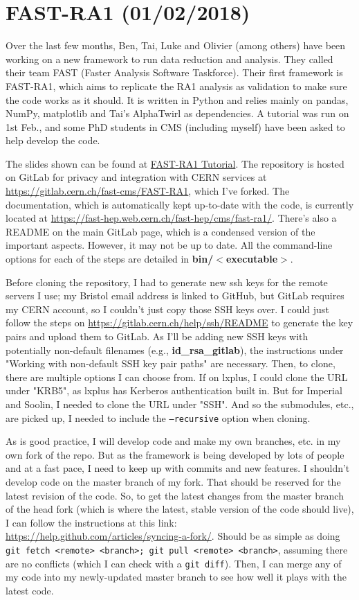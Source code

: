 
\chapter{FAST-RA1 (01/02/2018)}
\label{sec:fast-ra1}

Over the last few months, Ben, Tai, Luke and Olivier (among others) have been working on a new framework to run data reduction and analysis. They called their team FAST (Faster Analysis Software Taskforce). Their first framework is FAST-RA1, which aims to replicate the RA1 analysis as validation to make sure the code works as it should. It is written in Python and relies mainly on pandas, NumPy, matplotlib and Tai's AlphaTwirl as dependencies. A tutorial was run on 1st Feb., and some PhD students in CMS (including myself) have been asked to help develop the code.

The slides shown can be found at \href{run:sec36/FAST-RA1 Tutorial.pdf}{FAST-RA1 Tutorial}. The repository is hosted on GitLab for privacy and integration with CERN services at \url{https://gitlab.cern.ch/fast-cms/FAST-RA1}, which I've forked. The documentation, which is automatically kept up-to-date with the code, is currently located at \url{https://fast-hep.web.cern.ch/fast-hep/cms/fast-ra1/}. There's also a README on the main GitLab page, which is a condensed version of the important aspects. However, it may not be up to date. All the command-line options for each of the steps are detailed in \textbf{bin/$<$executable$>$}. 

Before cloning the repository, I had to generate new ssh keys for the remote servers I use; my Bristol email address is linked to GitHub, but GitLab requires my CERN account, so I couldn't just copy those SSH keys over. I could just follow the steps on \url{https://gitlab.cern.ch/help/ssh/README} to generate the key pairs and upload them to GitLab. As I'll be adding new SSH keys with potentially non-default filenames (e.g., \textbf{id\_rsa\_gitlab}), the instructions under "Working with non-default SSH key pair paths" are necessary. Then, to clone, there are multiple options I can choose from. If on lxplus, I could clone the URL under "KRB5", as lxplus has Kerberos authentication built in. But for Imperial and Soolin, I needed to clone the URL under "SSH". And so the submodules, etc., are picked up, I needed to include the \texttt{--recursive} option when cloning.

As is good practice, I will develop code and make my own branches, etc. in my own fork of the repo. But as the framework is being developed by lots of people and at a fast pace, I need to keep up with commits and new features. I shouldn't develop code on the master branch of my fork. That should be reserved for the latest revision of the code. So, to get the latest changes from the master branch of the head fork (which is where the latest, stable version of the code should live), I can follow the instructions at this link: \url{https://help.github.com/articles/syncing-a-fork/}. Should be as simple as doing \texttt{git fetch <remote> <branch>; git pull <remote> <branch>}, assuming there are no conflicts (which I can check with a \texttt{git diff}). Then, I can merge any of my code into my newly-updated master branch to see how well it plays with the latest code.


